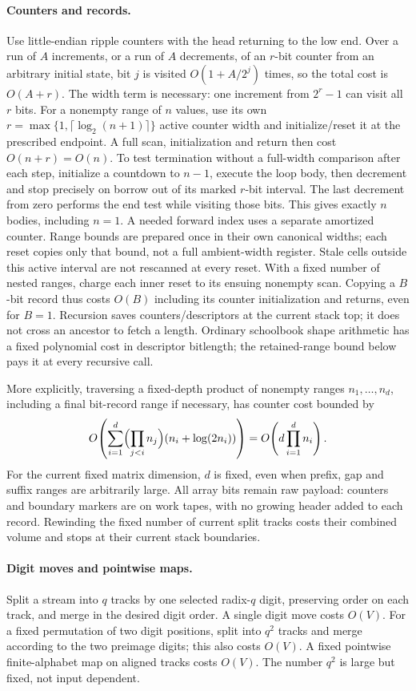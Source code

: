 \paragraph{Counters and records.}
Use little-endian ripple counters with the head returning to the low
end. Over a run of $A$ increments, or a run of $A$ decrements, of an $r$-bit
counter from an arbitrary initial state, bit $j$ is visited
$O(1+A/2^j)$ times, so the total cost is $O(A+r)$.
The width term is necessary: one increment from $2^r-1$ can visit
all $r$ bits. For a nonempty range of $n$ values, use its own
$r=\max\{1,\lceil\log_2(n+1)\rceil\}$ active counter width and
initialize/reset it at the prescribed endpoint. A full scan,
initialization and return then cost $O(n+r)=O(n)$.
To test termination without a full-width comparison after each step,
initialize a countdown to $n-1$, execute the loop body, then
decrement and stop precisely on borrow out of its marked $r$-bit
interval. The last decrement from zero performs the end test
while visiting those bits. This gives exactly $n$ bodies, including
$n=1$. A needed forward index uses a separate amortized counter.
Range bounds are prepared once in their own canonical widths;
each reset copies only that bound, not a full ambient-width register.
Stale cells outside this active interval are not rescanned at every
reset. With a fixed number of nested ranges, charge each inner reset
to its ensuing nonempty scan. Copying a $B$-bit record thus costs
$O(B)$ including its counter initialization and returns, even for
$B=1$. Recursion saves counters/descriptors at the current stack top;
it does not cross an ancestor to fetch a length. Ordinary schoolbook
shape arithmetic has a fixed polynomial cost in descriptor bitlength;
the retained-range bound below pays it at every recursive call.

More explicitly, traversing a fixed-depth product of nonempty ranges
$n_1,\ldots,n_d$, including a final bit-record range if necessary,
has counter cost bounded by
\[
 O\!\left(\sum_{i=1}^d
       \Bigl(\prod_{j<i}n_j\Bigr)
       (n_i+\log(2n_i))\right)
   =O\!\left(d\prod_{i=1}^d n_i\right).
\]
For the current fixed matrix dimension, $d$ is fixed, even when
prefix, gap and suffix ranges are arbitrarily large. All array
bits remain raw payload: counters and boundary markers are on
work tapes, with no growing header added to each record. Rewinding
the fixed number of current split tracks costs their combined
volume and stops at their current stack boundaries.

\paragraph{Digit moves and pointwise maps.}
Split a stream into $q$ tracks by one selected radix-$q$ digit, preserving
order on each track, and merge in the desired digit order.  A single
digit move costs $O(V)$.  For a fixed permutation of two digit positions,
split into $q^2$ tracks and merge according to the two preimage digits;
this also costs $O(V)$.  A fixed pointwise finite-alphabet map on aligned
tracks costs $O(V)$.  The number $q^2$ is large but fixed, not input
dependent.

